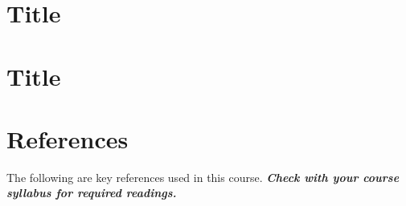 \documentclass[
]{book}
\begin{document}
\hypertarget{title-6}{%
\chapter{Title}\label{title-6}}

\hypertarget{title-7}{%
\chapter{Title}\label{title-7}}

\hypertarget{references}{%
\chapter*{References}\label{references}}

The following are key references used in this course. \textbf{\emph{Check with your course syllabus for required readings.}}

  
\end{document}
